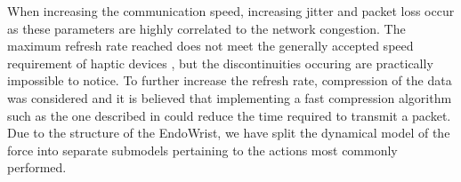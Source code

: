 When increasing the communication speed, increasing jitter and packet loss occur as these parameters are highly correlated to
the network congestion. %
The maximum refresh rate reached does not meet the generally accepted speed requirement of haptic devices \cite{coles2011role}, but the discontinuities occuring are practically impossible to notice.
To further increase the refresh rate, compression of the data
was considered and it is believed that implementing a fast
compression algorithm such as the one described in \cite{fast_ZIV} could reduce the time required to transmit a packet.
Due to the structure of the EndoWrist, we have split the
dynamical model of the force into separate submodels pertaining
to the actions most commonly performed.